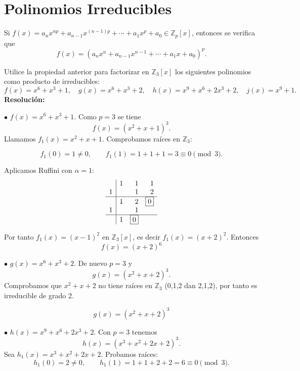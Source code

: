 \documentclass[a4paper,12pt]{article}
\begin{document}
\section{Polinomios Irreducibles}

\begin{ejercicio}[title=Ejercicio 51]
Si $f(x) = a_nx^{np} + a_{n-1}x^{(n-1)p} + \cdots + a_1x^p + a_0 \in \mathbb{Z}_p[x]$, entonces se verifica que
\[
f(x) = (a_nx^n + a_{n-1}x^{n-1} + \cdots + a_1x + a_0)^p.
\]

Utilice la propiedad anterior para factorizar en $\mathbb{Z}_3[x]$ los siguientes polinomios como producto de irreducibles:
\[
f(x) = x^6 + x^3 + 1, \quad g(x) = x^6 + x^3 + 2, \quad h(x) = x^9 + x^6 + 2x^3 + 2, \quad j(x) = x^9 + 1.
\]
\tcblower
\textbf{Resolución:}

\medskip

\noindent\(\bullet\) \(f(x)=x^6+x^3+1\). Como \(p=3\) se tiene
\[
f(x)=(x^2+x+1)^3.
\]
Llamamos \(f_1(x)=x^2+x+1\). Comprobamos raíces en \(\mathbb{Z}_3\):

\[
f_1(0)=1\neq 0,\qquad f_1(1)=1+1+1=3\equiv 0\pmod{3}.
\]

Aplicamos Ruffini con \(\alpha=1\):
\[
\begin{array}{r|rrr}
  & 1 & 1 & 1 \\
1 &   & 1 & 2 \\
\hline
  & 1 & 2 & \boxed{0} \\
1 &   & 1 \\
\hline
  & 1 & \boxed{0}
\end{array}
\]

Por tanto \(f_1(x)=(x-1)^2\) en \(\mathbb{Z}_3[x]\), es decir \(f_1(x)=(x+2)^2\). Entonces
\[
\boxed{f(x)=(x+2)^6}
\]

\medskip

\noindent\(\bullet\) \(g(x)=x^6+x^3+2\). De nuevo \(p=3\) y
\[
g(x)=(x^2+x+2)^3.
\]
Comprobamos que \(x^2+x+2\) no tiene raíces en \(\mathbb{Z}_3\) (0,1,2 dan 2,1,2), por tanto es irreducible de grado 2.

\[
\boxed{g(x)=(x^2+x+2)^3}
\]

\medskip

\noindent\(\bullet\) \(h(x)=x^9+x^6+2x^3+2\). Con \(p=3\) tenemos
\[
h(x)=(x^3+x^2+2x+2)^3.
\]
Sea \(h_1(x)=x^3+x^2+2x+2\). Probamos raíces:
\[
h_1(0)=2\neq0,\qquad h_1(1)=1+1+2+2=6\equiv0\pmod{3}.
\]

\end{ejercicio}
\end{document}
